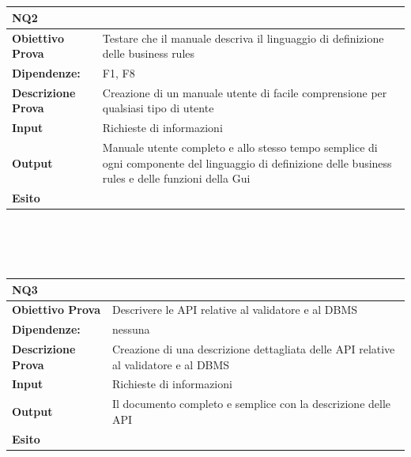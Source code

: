 \documentclass[11pt,titlepage,a4paper]{report}
\begin{document}
\\
\\
\begin{tabular}{||p{4.5cm}||p{7.5cm}||}
\hline
\textbf{\textsf{NQ2}}& \\
\hline
{\textbf {Obiettivo Prova}}& Testare che il manuale descriva il linguaggio di definizione delle business rules \\ \hline
{\textbf{Dipendenze:}}&  F1, F8 \\ \hline
{\textbf{Descrizione Prova}}&  Creazione di un manuale utente di facile comprensione per qualsiasi tipo di utente \\ \hline
{\textbf{Input}}&  Richieste di informazioni \\ \hline  %
{\textbf{Output}}& Manuale utente completo e allo stesso tempo semplice di ogni componente del linguaggio di definizione delle business rules e delle funzioni della Gui \\ \hline
{\textbf{Esito}}&  \\ \hline
\end{tabular} \\
\\
\\
\begin{tabular}{||p{4.5cm}||p{7.5cm}||}
\hline
\textbf{\textsf{NQ3}}& \\
\hline
{\textbf {Obiettivo Prova}}& Descrivere le API relative al validatore e al DBMS\\ \hline
{\textbf{Dipendenze:}}& nessuna \\ \hline
{\textbf{Descrizione Prova}}&  Creazione di una descrizione dettagliata delle API relative al validatore e al DBMS\\ \hline
{\textbf{Input}}&  Richieste di informazioni \\ \hline  %
{\textbf{Output}}& Il documento completo e semplice con la descrizione delle API  \\ \hline
{\textbf{Esito}}&  \\ \hline
\end{tabular} \\
\end{document}
